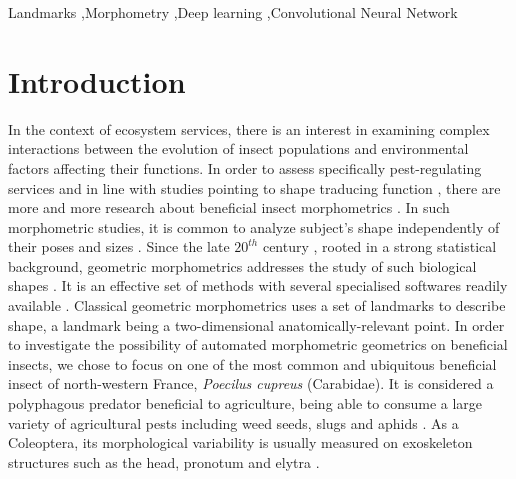 \documentclass[review]{elsarticle}
\begin{document}
\begin{frontmatter}
\begin{keyword}
Landmarks \sep Morphometry \sep Deep learning \sep Convolutional Neural Network
\end{keyword}

\end{frontmatter}

\linenumbers

\section{Introduction}

In the context of ecosystem services, there is an interest in examining complex interactions between the evolution of insect populations and environmental factors affecting their functions. In order to assess specifically pest-regulating services and in line with studies pointing to shape traducing function \cite{klingenberg_evolution_2010}, there are more and more research about beneficial insect morphometrics \cite{sasakawa_utility_2016,raymond_combination_2014}. 
 In such morphometric studies, it is common to analyze subject's shape independently of their poses and sizes \cite{kendall_diffusion_1977}. Since the late $20^{th}$ century \cite{bookstein_foundations_1982}, rooted in a strong statistical background, geometric morphometrics addresses the study of such biological shapes \cite{rohlf_applications_1998}. It is an effective set of methods with several specialised softwares readily available \cite{adams_geomorph:_2013,klingenberg_morphoj:_2011}. Classical geometric morphometrics uses a set of landmarks to describe shape, a landmark being a two-dimensional anatomically-relevant point. In order to investigate the possibility of automated morphometric geometrics on beneficial insects, we chose to focus on one of the most common and ubiquitous beneficial insect of north-western France, \textit{Poecilus cupreus} (Carabidae). It is considered a polyphagous predator \cite{larochelle_1990} beneficial to agriculture, being able to consume a large variety of agricultural pests including weed seeds, slugs and aphids \cite{kromp_carabid_1999}. As a Coleoptera, its morphological variability is usually measured on exoskeleton structures such as the head, pronotum and elytra \cite{eldred_does_2016}. 
 
\end{document}
